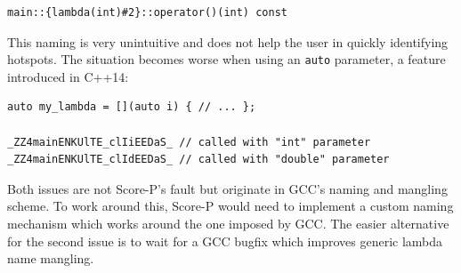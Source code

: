 \begin{verbatim}
main::{lambda(int)#2}::operator()(int) const
\end{verbatim}

This naming is very unintuitive and does not help the user in quickly identifying hotspots. The situation becomes worse when using an \texttt{auto} parameter, a feature introduced in C++14:

\begin{verbatim}
auto my_lambda = [](auto i) { // ... };

_ZZ4mainENKUlTE_clIiEEDaS_ // called with "int" parameter
_ZZ4mainENKUlTE_clIdEEDaS_ // called with "double" parameter
\end{verbatim}

Both issues are not Score-P's fault but originate in GCC's naming and mangling scheme. To work around this, Score-P would need to implement a custom naming mechanism which works around the one imposed by GCC. The easier alternative for the second issue is to wait for a GCC bugfix which improves generic lambda name mangling.